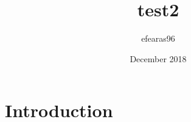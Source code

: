 \documentclass{article}
\title{test2}
\author{efearas96 }
\date{December 2018}
\begin{document}
\maketitle

\section{Introduction}
\end{document}
